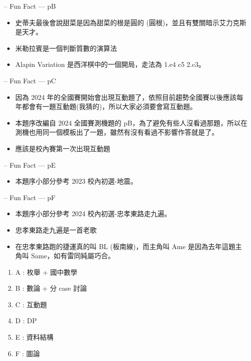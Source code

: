 \documentclass[hyperref,UTF8,notheorems,xcolor={dvipsnames}]{beamer}
\newcommand{\btitle}[1]{{\secname} -- #1}
\theoremstyle{definition}
\begin{document}
\begin{frame}[fragile]{\btitle{Fun Fact --- pB}}
	\begin{itemize}
		\item 史蒂夫最後會說甜菜是因為甜菜的根是圓的 (圓根)，並且有雙關暗示艾力克斯是天才。
		\pause
		\item 米勒拉賓是一個判斷質數的演算法
		\pause
		\item Alapin Variation 是西洋棋中的一個開局，走法為 1.e4 c5 2.c3。
	\end{itemize}
\end{frame}

\begin{frame}[fragile]{\btitle{Fun Fact --- pC}}
	\begin{itemize}
		\item 因為 2024 年的全國賽開始會出現互動題了，依照目前趨勢全國賽以後應該每年都會有一題互動題(我猜的)，所以大家必須要會寫互動題。
		\pause
		\item 本題序改編自 2024 全國賽測機題的 pB，為了避免有些人沒看過那題，所以在測機也用同一個模板出了一題，雖然有沒有看過不影響作答就是了。
		\pause
		\item 應該是校內賽第一次出現互動題
	\end{itemize}
\end{frame}

\begin{frame}[fragile]{\btitle{Fun Fact --- pE}}
	\begin{itemize}
		\item 本題序小部分參考 2023 校內初選-地震。
	\end{itemize}
\end{frame}

\begin{frame}[fragile]{\btitle{Fun Fact --- pF}}
	\begin{itemize}
		\item 本題序小部分參考 2024 校內初選-忠孝東路走九遍。
		\pause
		\item 忠孝東路走九遍是一首老歌
		\pause 
		\item 在忠孝東路跑的捷運真的叫 BL (板南線)，而主角叫 Ame 是因為去年這題主角叫 Same，如有雷同純屬巧合。
	\end{itemize}
\end{frame}


\begin{frame}[fragile]{\secname}
	\begin{enumerate}
		\item A : 枚舉 + 國中數學
		\item B : 數論 + 分 case 討論
		\item C : 互動題
		\item D : DP
		\item E : 資料結構
		\item F : 圖論
	\end{enumerate}
\end{frame}
\end{document}
